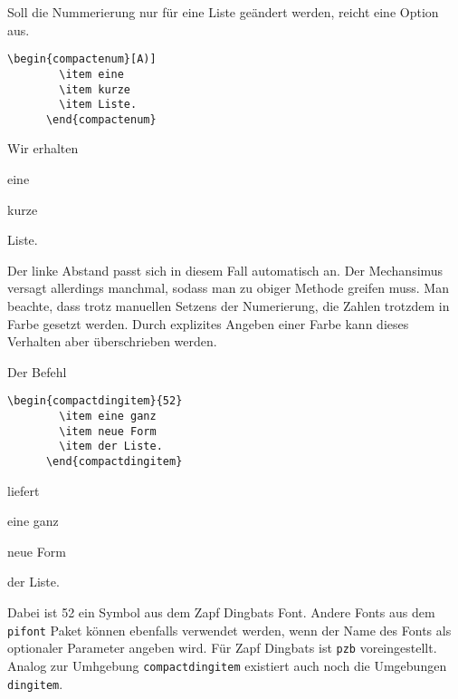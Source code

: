 \documentclass{exercise}
\begin{document}
    Soll die Nummerierung nur für eine Liste geändert werden, reicht eine Option aus.
    \begin{lstlisting}[gobble=6]
      \begin{compactenum}[A)]
        \item eine
        \item kurze
        \item Liste.
      \end{compactenum}
    \end{lstlisting}
    Wir erhalten
    \begin{compactenum}[A)]
      \item eine
      \item kurze
      \item Liste.
    \end{compactenum}
    Der linke Abstand passt sich in diesem Fall automatisch an. Der Mechansimus
    versagt allerdings manchmal, sodass man zu obiger Methode greifen muss.
    Man beachte, dass trotz manuellen Setzens
    der Numerierung, die Zahlen trotzdem in Farbe gesetzt werden. Durch explizites
    Angeben einer Farbe kann dieses Verhalten aber überschrieben werden.
    
    Der Befehl
    \begin{lstlisting}[gobble=6]
      \begin{compactdingitem}{52}
        \item eine ganz
        \item neue Form
        \item der Liste.
      \end{compactdingitem}
    \end{lstlisting}
    liefert
    \begin{compactdingitem}{52}
      \item eine ganz
      \item neue Form
      \item der Liste.
    \end{compactdingitem}
    Dabei ist 52 ein Symbol aus dem Zapf Dingbats Font. Andere Fonts
    aus dem \texttt{pifont} Paket können ebenfalls verwendet werden,
    wenn der Name des Fonts als optionaler Parameter angeben wird.
    Für Zapf Dingbats ist \texttt{pzb} voreingestellt.
    Analog zur Umhgebung \lstinline-compactdingitem- existiert auch noch die
    Umgebungen \lstinline-dingitem-.
    
\end{document}
